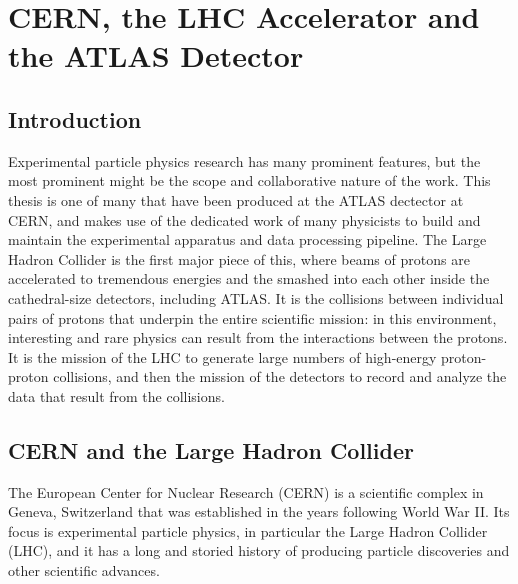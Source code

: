  

\chapter[ATLAS Detector]{CERN, the LHC Accelerator and the ATLAS Detector}




\section{Introduction}
Experimental particle physics research has many prominent features, but the most prominent
might be the scope and collaborative nature of the work.  This thesis is one of many that have
been produced at the ATLAS dectector at CERN, and makes use of the dedicated work of many
physicists to build and maintain the experimental apparatus and data processing pipeline.
The Large Hadron Collider is the first major piece of this, where beams of protons are accelerated to
tremendous energies and the smashed into each other inside the cathedral-size detectors, including ATLAS.
It is the collisions
between individual pairs of protons that underpin the entire scientific mission: in this environment,
interesting and rare physics can result from the interactions between the protons.  It is the mission of the
LHC to generate large numbers of high-energy proton-proton collisions, and then the mission of the detectors
to record and analyze the data that result from the collisions.  



\section{CERN and the Large Hadron Collider}
\label{sec:cern_lhc}
The European Center for Nuclear Research (CERN) is a scientific complex in Geneva, Switzerland that was established 
in the years following World War II.  Its focus is experimental particle physics, in particular the Large Hadron 
Collider (LHC), and it has a long and storied history of producing particle discoveries and other scientific
advances.

